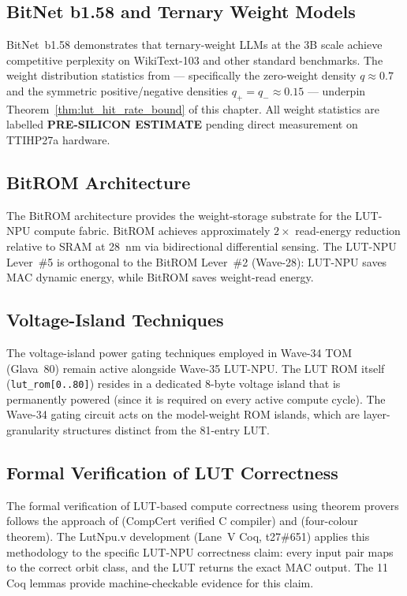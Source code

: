 \subsection{BitNet b1.58 and Ternary Weight Models}

BitNet~b1.58 \cite{bitnet_b158_2024} demonstrates that ternary-weight
LLMs at the 3B scale achieve competitive perplexity on WikiText-103 and
other standard benchmarks.  The weight distribution statistics from
\cite{bitnet_b158_2024} — specifically the zero-weight density $q \approx 0.7$
and the symmetric positive/negative densities $q_{+} = q_{-} \approx 0.15$ —
underpin Theorem~\ref{thm:lut_hit_rate_bound} of this chapter.  All
weight statistics are labelled \textbf{PRE-SILICON ESTIMATE} pending
direct measurement on TTIHP27a hardware.

\subsection{BitROM Architecture}

The BitROM architecture \cite{bitrom_2025} provides the weight-storage
substrate for the LUT-NPU compute fabric.  BitROM achieves approximately
$2\times$ read-energy reduction relative to SRAM at 28~nm via bidirectional
differential sensing.  The LUT-NPU Lever~\#5 is orthogonal to the
BitROM Lever~\#2 (Wave-28): LUT-NPU saves MAC dynamic energy, while BitROM
saves weight-read energy.

\subsection{Voltage-Island Techniques}

The voltage-island power gating techniques \cite{shi_voltage_island_2014}
employed in Wave-34 TOM (Glava~80) remain active alongside Wave-35 LUT-NPU.
The LUT ROM itself (\texttt{lut\_rom[0..80]}) resides in a dedicated
8-byte voltage island that is permanently powered (since it is required
on every active compute cycle).  The Wave-34 gating circuit acts on
the model-weight ROM islands, which are layer-granularity structures
distinct from the 81-entry LUT.

\subsection{Formal Verification of LUT Correctness}

The formal verification of LUT-based compute correctness using theorem
provers follows the approach of \cite{leroy_compcert} (CompCert verified
C compiler) and \cite{gonthier_4ct} (four-colour theorem).  The LutNpu.v
development (Lane~V Coq, t27\#651) applies this methodology to the
specific LUT-NPU correctness claim: every input pair maps to the correct
orbit class, and the LUT returns the exact MAC output.  The 11 Coq lemmas
provide machine-checkable evidence for this claim.

